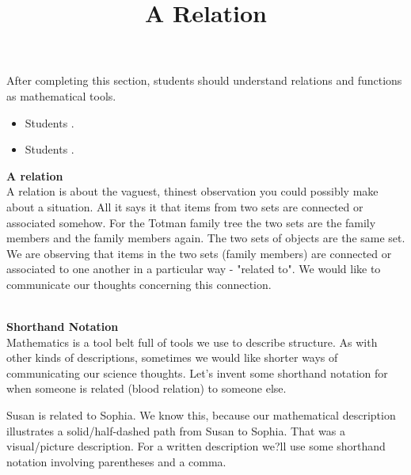 \documentclass{ximera}
\title{A Relation}
\begin{document}
\begin{abstract}
\end{abstract}

\maketitle

\begin{sectionOutcomes}

After completing this section, students should understand relations and functions as mathematical tools. 

\begin{itemize}
\item Students .
\item Students .
\end{itemize}

\end{sectionOutcomes}




\textbf{A relation} \\
A relation is about the vaguest, thinest observation you could possibly make about a situation.  All it says it that items from two sets are connected or associated somehow.  For the Totman family tree the two sets are the family members and the family members again. The two sets of objects are the same set.  We are observing that items in the two sets (family members) are connected or associated to one another in a particular way - "related to". 
We would like to communicate our thoughts concerning this connection. 

\begin{center}
\end{center}
\quad \\







\textbf{Shorthand Notation} \\
Mathematics is a tool belt full of tools we use to describe structure. As with other kinds of descriptions, sometimes we would like shorter ways of communicating our science thoughts.  Let's invent some shorthand notation for when someone is related (blood relation) to someone else.

Susan is related to Sophia. We know this, because our mathematical description illustrates a solid/half-dashed path from Susan to Sophia. That was a visual/picture description. For a written description we?ll use some shorthand notation involving parentheses and a comma.
\end{document}
